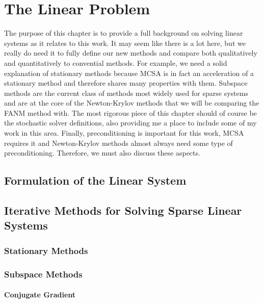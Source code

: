 \chapter{The Linear Problem}
\label{ch:linear_problem}

The purpose of this chapter is to provide a full background on solving
linear systems as it relates to this work. It may seem like there is a
lot here, but we really do need it to fully define our new methods and
compare both qualitatively and quantitatively to convential
methods. For example, we need a solid explanation of stationary
methods because MCSA is in fact an acceleration of a stationary method
and therefore shares many properties with them. Subspace methods are
the current class of methods most widely used for sparse systems and
are at the core of the Newton-Krylov methods that we will be comparing
the FANM method with. The most rigorous piece of this chapter should
of course be the stochastic solver definitions, also providing me a
place to include some of my work in this area. Finally,
preconditioning is important for this work, MCSA requires it and
Newton-Krylov methods almost always need some type of
preconditioning. Therefore, we must also discuss these aspects.

\section{Formulation of the Linear System}
\label{sec:linear_system}

\section{Iterative Methods for Solving Sparse Linear Systems}
\label{sec:linear_methods}

\subsection{Stationary Methods}
\label{subsec:stationary_methods}

\subsection{Subspace Methods}
\label{subsec:subspace_methods}

\subsubsection{Conjugate Gradient}
\label{subsubsec:conjugate_gradient}

